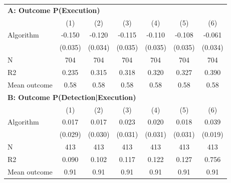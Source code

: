 \begin{tabular}{lcccccc} \toprule
\multicolumn{7}{l}{\textbf{A: Outcome P(Execution)}} \\ \multicolumn{1}{l}{} & (1) & (2) & (3) & (4) & (5) & (6) \\ \midrule
Algorithm   &      -0.150\sym{***}&      -0.120\sym{***}&      -0.115\sym{***}&      -0.110\sym{***}&      -0.108\sym{***}&      -0.061\sym{*}  \\
            &     (0.035)         &     (0.034)         &     (0.035)         &     (0.035)         &     (0.035)         &     (0.034)         \\
\midrule
N           &         704         &         704         &         704         &         704         &         704         &         704         \\
R2          &       0.235         &       0.315         &       0.318         &       0.320         &       0.327         &       0.390         \\
Mean outcome&        0.58         &        0.58         &        0.58         &        0.58         &        0.58         &        0.58         \\

\midrule \multicolumn{7}{l}{\textbf{B: Outcome P(Detection|Execution)}} \\ \multicolumn{1}{l}{} & (1) & (2) & (3) & (4) & (5) & (6) \\ \midrule
Algorithm   &       0.017         &       0.017         &       0.023         &       0.020         &       0.018         &       0.039\sym{**} \\
            &     (0.029)         &     (0.030)         &     (0.031)         &     (0.031)         &     (0.031)         &     (0.019)         \\
\midrule
N           &         413         &         413         &         413         &         413         &         413         &         413         \\
R2          &       0.090         &       0.102         &       0.117         &       0.122         &       0.127         &       0.756         \\
Mean outcome&        0.91         &        0.91         &        0.91         &        0.91         &        0.91         &        0.91         \\


\end{tabular}
